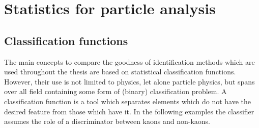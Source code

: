 \chapter{Statistics for particle analysis}
\label{chap:statistics}

\section{Classification functions}
\label{sec:classification_functions}

The main concepts to compare the goodness of identification methods which are used throughout the thesis are based on statistical classification functions. However, their use is not limited to physics, let alone particle physics, but spans over all field containing some form of (binary) classification problem. A classification function is a tool which separates elements which do not have the desired feature from those which have it.
In the following examples the classifier assumes the role of a discriminator between kaons and non-kaons.

